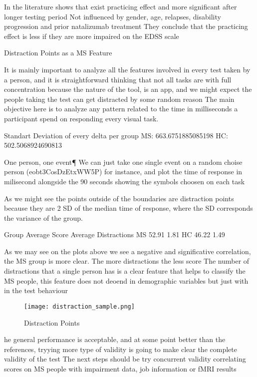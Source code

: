\documentclass[letterpaper, 10 pt, conference]{ieeeconf}
\begin{document}
In the literature shows that exist practicing effect and more significant after longer testing period
Not influenced by gender, age, relapses, disability progression and prior natalizumab treatment
They conclude that the practicing effect is less if they are more impaired on the EDSS scale
\vspace{3mm}

Distraction Points as a MS Feature

It is mainly important to analyze all the features involved in every test taken by a person, and it is straightforward thinking that not all tasks are with full concentration because the nature of the tool, is an app, and we might expect the people taking the test can get distracted by some random reason
The main objective here is to analyze any pattern related to the time in milliseconds a participant spend on responding every visual task.

Standart Deviation of every delta per group 
 MS: 663.6751885085198 
 HC: 502.5068924690813
 
  One person, one event¶
We can just take one single event on a random choise person (eobt3CosDzEtxWW5P) for instance, and plot the time of response in milisecond alongside the 90 seconds showing the symbols choosen on each task

As we might see the points outside of the boundaries are distraction points because they are 2 SD of the median time of response, where the SD corresponds the variance of the group.

Group	Average Score	Average Distractions
MS	52.91	1.81
HC	46.22	1.49

As we may see on the plots above we see a negative and significative correlation, the MS group is more clear. The more distractions the less score
The number of distractions that a single person has is a clear feature that helps to classify the MS people, this feature does not deoend in demographic variables but just with in the test behaviour
\begin{figure}[ht]
\texttt{[image: distraction\_sample.png]}
\caption{Distraction Points}
\label{tab:dis}
\end{figure}

he general performance is acceptable, and at some point better than the references, tryying more type of validity is going to make clear the complete validity of the test
The next steps should be try concurrent validity correlating scores on MS people with impairment data, job information or fMRI results
\end{document}
